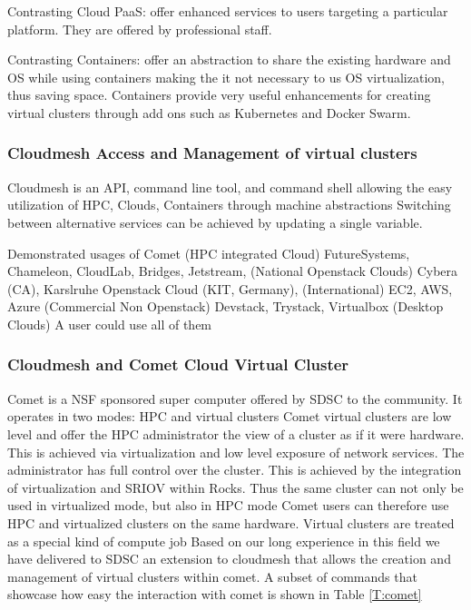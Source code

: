 Contrasting Cloud PaaS: offer enhanced services to users targeting a
particular platform. They are offered by professional staff.

Contrasting Containers: offer an abstraction to share the existing hardware and OS while using containers making the it not necessary to us OS virtualization, thus saving space. Containers provide very useful enhancements for creating virtual clusters through add ons such as Kubernetes and Docker Swarm.



\subsubsection{Cloudmesh Access and Management of virtual clusters}
Cloudmesh is an API, command line tool, and command shell allowing the easy utilization of HPC, Clouds, Containers through machine abstractions
Switching between alternative services can be achieved by updating a
single variable.

Demonstrated usages of
Comet
(HPC integrated Cloud)
FutureSystems, Chameleon, CloudLab, Bridges, Jetstream,
(National Openstack Clouds)
Cybera (CA), Karslruhe Openstack Cloud (KIT, Germany),
(International)
EC2, AWS, Azure
(Commercial Non Openstack)
Devstack, Trystack, Virtualbox
(Desktop Clouds)
A user could use all of them

\subsubsection{Cloudmesh and Comet Cloud Virtual Cluster}

Comet is a NSF sponsored super computer offered by SDSC to the
community. It operates in two modes: HPC and virtual clusters Comet
virtual clusters are low level and offer the HPC administrator the
view of a cluster as if it were hardware. This is achieved via
virtualization and low level exposure of network services. The
administrator has full control over the cluster.  This is achieved by
the integration of virtualization and SRIOV within Rocks. Thus the
same cluster can not only be used in virtualized mode, but also in HPC
mode Comet users can therefore use HPC and virtualized clusters on the
same hardware. Virtual clusters are treated as a special kind of
compute job Based on our long experience in this field we have
delivered to SDSC an extension to cloudmesh that allows the creation
and management of virtual clusters within comet. A subset of commands
that showcase how easy the interaction with comet is shown in Table \ref{T:comet}


